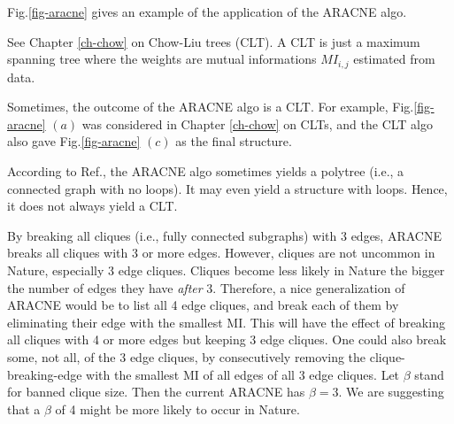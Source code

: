Fig.\ref{fig-aracne}
gives an example 
of the application
of the ARACNE algo.

See Chapter \ref{ch-chow} on 
Chow-Liu trees (CLT).
A CLT is just
a  maximum spanning tree
where the weights are 
mutual informations 
 $MI_{i,j}$
estimated from data.

Sometimes, the outcome
of the ARACNE algo is a CLT.
For example,
Fig.\ref{fig-aracne}
$(a)$
was considered
in Chapter \ref{ch-chow}
on CLTs, and
the CLT algo
also
gave 
Fig.\ref{fig-aracne}
$(c)$ as the final structure.

According to Ref.\cite{aracne}, the 
 ARACNE algo sometimes 
yields  a polytree (i.e., 
a connected graph with no loops).
It may even  
yield a structure with loops.
Hence, it does not always yield a CLT.

By breaking all cliques (i.e., fully
connected subgraphs)
with 3 edges, ARACNE 
breaks all cliques with  
3 or more edges. 
However, cliques are 
not uncommon in Nature,
especially 3 edge cliques. 
Cliques become less likely in Nature 
the bigger the number of edges they have
{\it after} 3.
Therefore, a nice  
generalization of ARACNE
would be to list all 
4 edge cliques,
and break each of 
them by eliminating their edge
with the smallest MI.
This will
have the effect of breaking
all cliques with 
4 or more edges
but keeping 3 edge cliques.
One could also break
some, not all, of the 3 edge cliques,
by consecutively removing the 
clique-breaking-edge 
with the smallest
MI
of all edges of all 3 edge cliques.
Let $\beta$ stand for banned clique
size.  Then
the current ARACNE has 
$\beta=3$.
We are suggesting that a $\beta$ of
4 might be more likely
to occur in Nature.

